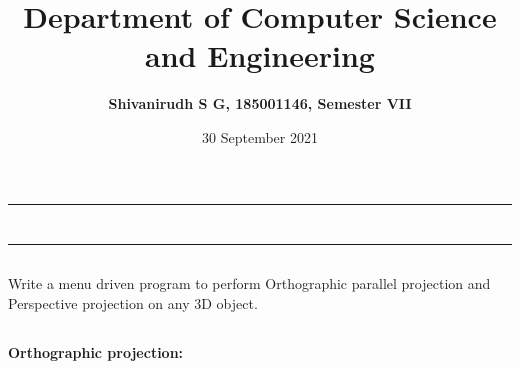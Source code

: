 \documentclass[9pt,letterpaper]{article}
\title{\textbf{Department of Computer Science and Engineering}}
\author{\textbf{Shivanirudh S G, 185001146, Semester VII }}
\date{30 September 2021}
\begin{document}
\maketitle
\hrule
\section*{}
\hrule 
\bigskip\bigskip

\subsection*{}

\subsection*{}
\begin{flushleft}
    Write a menu driven program to perform Orthographic parallel projection and Perspective projection on any 3D object.
\end{flushleft}

\subsection*{}
\begin{flushleft}




\end{flushleft}
\newpage
\subsection*{}
\textbf{Orthographic projection:}\\
\end{document}
